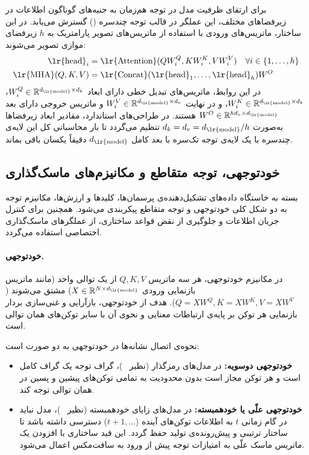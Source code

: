 برای ارتقای ظرفیت مدل در توجه هم‌زمان به جنبه‌های گوناگون اطلاعات در زیرفضاهای مختلف، این عملگر در قالب توجه چندسره () گسترش می‌یابد. در این ساختار، ماتریس‌های ورودی با استفاده از ماتریس‌های تصویر پارامتریک به $h$ زیرفضای موازی تصویر می‌شوند:
\begin{align}
    \text{\lr{head}}_i &= \text{\lr{Attention}}(QW_i^Q, KW_i^K, VW_i^V) \quad \forall i \in \{1, \dots, h\} \label{eq:chap2_mha_head} \\
    \text{\lr{MHA}}(Q, K, V) &= \text{\lr{Concat}}(\text{\lr{head}}_1, \dots, \text{\lr{head}}_h)W^O \label{eq:chap2_mha_concat}
\end{align}
در این روابط، ماتریس‌های تبدیل خطی دارای ابعاد $W_i^Q \in \mathbb{R}^{d_{\text{\lr{model}}} \times d_k}$، $W_i^K \in \mathbb{R}^{d_{\text{\lr{model}}} \times d_k}$، و در نهایت $W_i^V \in \mathbb{R}^{d_{\text{\lr{model}}} \times d_v}$ و ماتریس خروجی دارای بعد $W^O \in \mathbb{R}^{hd_v \times d_{\text{\lr{model}}}}$ هستند. در طراحی‌های استاندارد، مقادیر ابعاد زیرفضاها به‌صورت $d_k = d_v = d_{\text{\lr{model}}} / h$ تنظیم می‌گردد تا بار محاسباتی کل این لایه‌ی چندسره با یک لایه‌ی توجه تک‌سره با بعد کامل $d_{\text{\lr{model}}}$ دقیقاً یکسان باقی بماند.


\subsection{خودتوجهی، توجه متقاطع و مکانیزم‌های ماسک‌گذاری}\label{sec:2-2-3}

بسته به خاستگاه داده‌های تشکیل‌دهنده‌ی پرسمان‌ها، کلیدها و ارزش‌ها، مکانیزم توجه به دو شکل کلی خودتوجهی و توجه متقاطع پیکربندی می‌شود. همچنین برای کنترل جریان اطلاعات و جلوگیری از نقض قواعد ساختاری، از عملگرهای ماسک‌گذاری اختصاصی استفاده می‌گردد.

\paragraph{خودتوجهی.} در مکانیزم خودتوجهی، هر سه ماتریس $Q, K, V$ از یک توالی واحد (مانند ماتریس بازنمایی ورودی $X \in \mathbb{R}^{N \times d_{\text{\lr{model}}}}$) مشتق می‌شوند ($Q = XW^Q, K = XW^K, V = XW^V$). هدف از خودتوجهی، بازآرایی و غنی‌سازی بردار بازنمایی هر توکن بر پایه‌ی ارتباطات معنایی و نحوی آن با سایر توکن‌های همان توالی است.

نحوه‌ی اتصال نشانه‌ها در خودتوجهی به دو صورت است:
\begin{itemize}
    \item \textbf{خودتوجهی دوسویه:} در مدل‌های رمزگذار (نظیر ~\cite{devlin2019bert})، گراف توجه یک گراف کامل است و هر توکن مجاز است بدون محدودیت به تمامی توکن‌های پیشین و پسین در همان توالی توجه کند.
    \item \textbf{خودتوجهی علّی یا خودهمبسته:} در مدل‌های زایای خودهمبسته (نظیر ~\cite{brown2020language})، مدل نباید در گام زمانی $t$ به اطلاعات توکن‌های آینده ($t+1, \dots$) دسترسی داشته باشد تا ساختار ترتیبی و پیش‌رونده‌ی تولید حفظ گردد. این قید ساختاری با افزودن یک ماتریس ماسک علّی به امتیازات توجه پیش از ورود به سافت‌مکس اعمال می‌شود.
\end{itemize}

